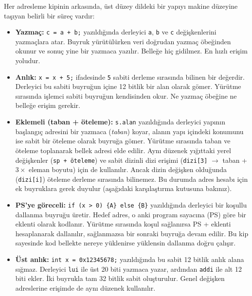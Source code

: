Her adresleme kipinin arkasında, üst düzey dildeki bir yapıyı makine düzeyine taşıyan belirli bir süreç vardır:

\begin{itemize}[nosep, leftmargin=*]
\item \textbf{Yazmaç:} \texttt{c = a + b;} yazıldığında derleyici \texttt{a}, \texttt{b} ve \texttt{c} değişkenlerini yazmaçlara atar. Buyruk yürütülürken veri doğrudan yazmaç öbeğinden okunur ve sonuç yine bir yazmaca yazılır. Belleğe hiç gidilmez. En hızlı erişim yoludur.

\item \textbf{Anlık:} \texttt{x = x + 5;} ifadesinde \texttt{5} sabiti derleme sırasında bilinen bir değerdir. Derleyici bu sabiti buyruğun içine 12 bitlik bir alan olarak gömer. Yürütme sırasında işlemci sabiti buyruğun kendisinden okur. Ne yazmaç öbeğine ne belleğe erişim gerekir.

\item \textbf{Eklemeli (taban + öteleme):} \texttt{s.alan} yazıldığında derleyici yapının başlangıç adresini bir yazmaca (\emph{taban}) koyar, alanın yapı içindeki konumunu ise sabit bir öteleme olarak buyruğa gömer. Yürütme sırasında taban ve öteleme toplanarak bellek adresi elde edilir. Aynı düzenek yığıttaki yerel değişkenler (\texttt{sp + öteleme}) ve sabit dizinli dizi erişimi (\texttt{dizi[3]} $\rightarrow$ taban + $3 \times$ eleman boyutu) için de kullanılır. Ancak dizin değişken olduğunda (\texttt{dizi[i]}) öteleme derleme sırasında bilinemez. Bu durumda adres hesabı için ek buyruklara gerek duyulur (aşağıdaki karşılaştırma kutusuna bakınız).

\item \textbf{PS'ye göreceli:} \texttt{if (x > 0) \{A\} else \{B\}} yazıldığında derleyici bir koşullu dallanma buyruğu üretir. Hedef adres, o anki program sayacına (PS) göre bir eklenti olarak kodlanır. Yürütme sırasında koşul sağlanırsa PS + eklenti hesaplanarak dallanılır, sağlanmazsa bir sonraki buyruğa devam edilir. Bu kip sayesinde kod bellekte nereye yüklenirse yüklensin dallanma doğru çalışır.

\item \textbf{Üst anlık:} \texttt{int x = 0x12345678;} yazıldığında bu sabit 12 bitlik anlık alana sığmaz. Derleyici \texttt{lui} ile üst 20 biti yazmaca yazar, ardından \texttt{addi} ile alt 12 biti ekler. İki buyrukla tam 32 bitlik sabit oluşturulur. Genel değişken adreslerine erişimde de aynı düzenek kullanılır.
\end{itemize}


